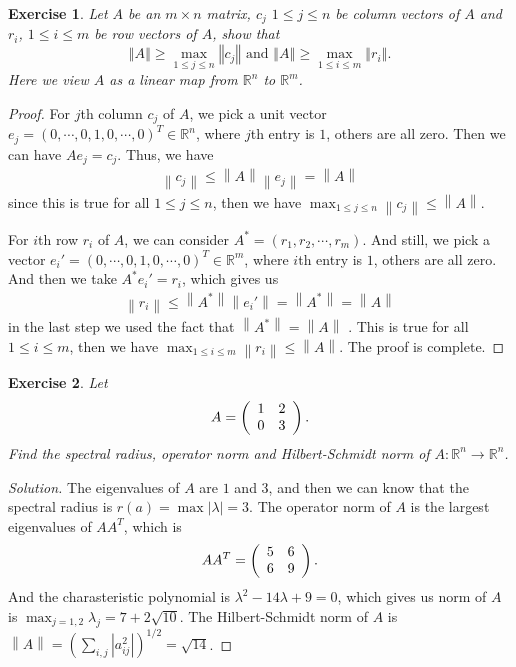 \documentclass[11pt]{book}
\newtheorem{exercise}{Exercise}[section]
\theoremstyle{definition}
\numberwithin{equation}{chapter}
\begin{document}
\begin{exercise}
Let $A$ be an $m\times n$ matrix, $c_{j}$ $1\leq j\leq n$ be column
vectors of $A$ and $r_{i}$, $1\leq i\leq m$ be row vectors of $A$, show that%
$$
\left\Vert A\right\Vert \geq\max_{1\leq j\leq n}\left\Vert c_{j}\right\Vert
\text{ and }\left\Vert A\right\Vert \geq\max_{1\leq i\leq m}\left\Vert
r_{i}\right\Vert .
$$
Here we view $A$ as a linear map from $\mathbb{R}^{n}$ to $\mathbb{R}^{m}$.
\end{exercise}
\begin{proof}
For $j$th column $c_j$ of $A$, we pick a unit vector $e_j = (0,\cdots, 0,1,0,\cdots,0)^T \in \mathbb{R}^n$, where $j$th entry is $1$, others are all zero. Then we can have $Ae_j = c_j$. Thus, we have 
\begin{align*}
    \left\|c_j \right\| \leq \left\|A \right\| \left\|e_j  \right\| = \left\|A \right\|
\end{align*}
since this is true for all $1\leq j \leq n$, then we have $\max_{1\leq j \leq n}\left\|c_j \right\| \leq \left\|A \right\|$. 

For $i$th row $r_i$ of $A$, we can consider $A^* = (r_1, r_2,\cdots, r_m)$. And still, we pick a vector $e_i' = (0,\cdots, 0,1,0,\cdots,0)^T \in \mathbb{R}^m$, where $i$th entry is $1$, others are all zero. And then we take $A^* e_i' = r_i$, which gives us 
\begin{align*}
    \left\|r_i \right\| \leq \left\|A^* \right\| \left\|e_i'  \right\| = \left\|A^* \right\| = \left\|A \right\|
\end{align*}
in the last step we used the fact that $\left\|A^* \right\| = \left\|A \right\|$ . This is true for all $1\leq i \leq m$, then we have $\max_{1\leq i \leq m}\left\|r_i \right\| \leq \left\|A \right\|$. The proof is complete.
\end{proof}

\medskip

\begin{exercise}
Let
$$
A=\left(
\begin{array}
[c]{cc}%
1 & 2\\
0 & 3
\end{array}
\right)  .
$$
Find the spectral radius, operator norm and Hilbert-Schmidt norm of
$A:\mathbb{R}^{n}\rightarrow\mathbb{R}^{n}$.
\end{exercise}
\begin{proof}[Solution]
The eigenvalues of $A$ are $1$ and $3$, and then we can know that the spectral radius is $r(a) = \max |\lambda| = 3$. The operator norm of $A$ is  the largest eigenvalues of $AA^T$, which is 
$$
AA^T=\left(
\begin{array}
[c]{cc}%
5 & 6\\
6 & 9
\end{array}
\right).
$$
And the charasteristic polynomial is $\lambda^2 - 14\lambda + 9 = 0$, which gives us norm of $A$ is $\max_{j=1,2} \lambda_j = 7+2\sqrt{10}$. The Hilbert-Schmidt norm of $A$ is $\left\| A\right\| = \left(\sum_{i,j}|a_{ij}^2| \right)^{1/2} = \sqrt{14}$.
\end{proof}
\end{document}
